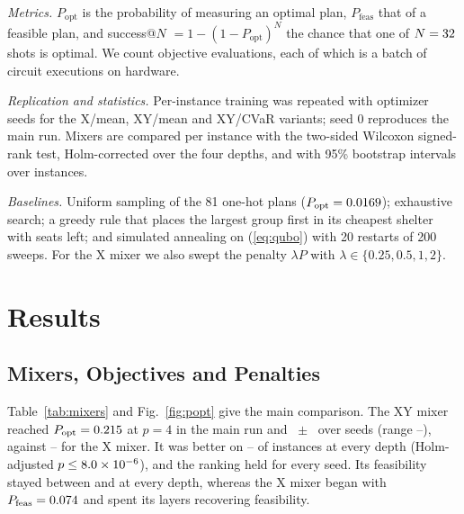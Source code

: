 \documentclass[conference]{IEEEtran}
\begin{document}
\textit{Metrics.} $P_{\mathrm{opt}}$ is the probability of measuring an optimal plan, $P_{\mathrm{feas}}$ that of a feasible plan, and success@$N$ $=1-(1-P_{\mathrm{opt}})^N$ the chance that one of $N=32$ shots is optimal. We count objective evaluations, each of which is a batch of circuit executions on hardware.

\textit{Replication and statistics.} Per-instance training was repeated with \NSeeds{} optimizer seeds for the X/mean, XY/mean and XY/CVaR variants; seed 0 reproduces the main run. Mixers are compared per instance with the two-sided Wilcoxon signed-rank test, Holm-corrected over the four depths, and with 95\% bootstrap intervals over instances.

\textit{Baselines.} Uniform sampling of the 81 one-hot plans ($P_{\mathrm{opt}}=0.0169$); exhaustive search; a greedy rule that places the largest group first in its cheapest shelter with seats left; and simulated annealing \cite{Kirkpatrick1983} on (\ref{eq:qubo}) with 20 restarts of 200 sweeps. For the X mixer we also swept the penalty $\lambda P$ with $\lambda\in\{0.25,0.5,1,2\}$.

\section{Results}
\subsection{Mixers, Objectives and Penalties}
Table~\ref{tab:mixers} and Fig.~\ref{fig:popt} give the main comparison. The XY mixer reached $P_{\mathrm{opt}}=0.215$ at $p=4$ in the main run and \SeedXYMean{}~$\pm$~\SeedXYSd{} over \NSeeds{} seeds (range \SeedXYMin--\SeedXYMax), against \SeedXMin--\SeedXMax{} for the X mixer. It was better on \StXYvXWinsMin--\StXYvXWinsMax{} of \NPaired{} instances at every depth (Holm-adjusted $p\le8.0\times10^{-6}$), and the ranking held for every seed. Its feasibility stayed between \XYPfeasMin{} and \XYPfeasMax{} at every depth, whereas the X mixer began with $P_{\mathrm{feas}}=0.074$ and spent its layers recovering feasibility.
\end{document}
